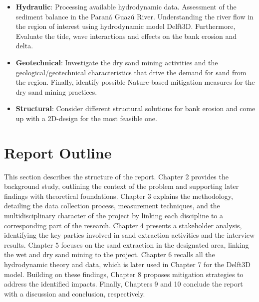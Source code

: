 \begin{itemize}
    \item \textbf{Hydraulic}: 
    Processing available hydrodynamic data.
    Assessment of the sediment balance in the Paraná Guazú River.
    Understanding the river flow in the region of interest using hydrodynamic model Delft3D. Furthermore, Evaluate the tide, wave interactions and effects on the bank erosion and delta. 
    
    \item \textbf{Geotechnical}: 
    Investigate the dry sand mining activities and the geological/geotechnical characteristics that drive the demand for sand from the region. Finally, identify possible Nature-based mitigation measures for the dry sand mining practices.
    \item \textbf{Structural}: Consider different structural solutions for bank erosion and come up with a 2D-design for the most feasible one.
\end{itemize}

\section{Report Outline}
\label{section: report outline}
This section describes the structure of the report. Chapter 2 provides the background study, outlining the context of the problem and supporting later findings with theoretical foundations. Chapter 3 explains the methodology, detailing the data collection process, measurement techniques, and the multidisciplinary character of the project by linking each discipline to a corresponding part of the research. Chapter 4 presents a stakeholder analysis, identifying the key parties involved in sand extraction activities and the interview results. Chapter 5 focuses on the sand extraction in the designated area, linking the wet and dry sand mining to the project. Chapter 6 recalls all the hydrodynamic theory and data, which is later used in Chapter 7 for the Delft3D model. Building on these findings, Chapter 8 proposes mitigation strategies to address the identified impacts. Finally, Chapters 9 and 10 conclude the report with a discussion and conclusion, respectively.



